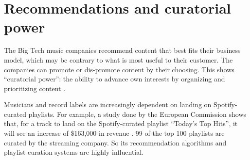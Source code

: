 \section{Recommendations and curatorial power}
\label{sec:problem-description-recommendations}
The Big Tech music companies recommend content that best fits their business model, which may be contrary to what is most useful to their customer. The companies can promote or dis-promote content by their choosing. This shows ``curatorial power'': the ability to advance own interests by organizing and prioritizing content \citep{prey2020locating}.

Musicians and record labels are increasingly dependent on landing on Spotify-curated playlists. For example, a study done by the European Commission shows that, for a track to land on the Spotify-curated playlist ``Today's Top Hits'', it will see an increase of \$163,000 in revenue \citep{aguiar2018platforms}. 99 of the top 100 playlists are curated by the streaming company. So its recommendation algorithms and playlist curation systems are highly influential. 

